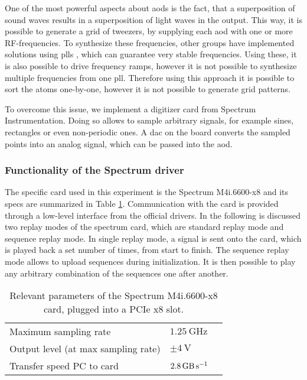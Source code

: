 One of the most powerful aspects about \acp{aod} is the fact, that a superposition of sound waves results in a superposition of light waves in the output. This way, it is possible to generate a grid of tweezers, by supplying each \ac{aod} with one or more RF-frequencies. To synthesize these frequencies, other groups have implemented solutions using \acp{pll} , which can guarantee very stable frequencies. Using these, it is also possible to drive frequency ramps, however it is not possible to synthesize multiple frequencies from one \ac{pll}. Therefore using this approach it is possible to sort the atoms one-by-one, however it is not possible to generate grid patterns.

To overcome this issue, we implement a digitizer card from Spectrum Instrumentation. Doing so allows to sample arbitrary signals, for example sines, rectangles or even non-periodic ones. A \ac{dac} on the board converts the sampled points into an analog signal, which can be passed into the \ac{aod}.

\subsubsection*{Functionality of the Spectrum driver}

The specific card used in this experiment is the Spectrum M4i.6600-x8 and its specs are summarized in Table \ref{tbl:spec_m4i}. Communication with the card is provided through a low-level interface from the official drivers. In the following is discussed two replay modes of the spectrum card, which are standard replay mode and sequence replay mode. In single replay mode, a signal is sent onto the card, which is played back a set number of times, from start to finish. The sequence replay mode allows to upload sequences during initialization. It is then possible to play any arbitrary combination of the sequences one after another.

\begin{table}[bt]
\label{tbl:spec_m4i}
\centering
\begin{tabular}{l|l|l}
	\hline \hline
	Maximum sampling rate & $\SI{1.25}{\giga\hertz}$ \\
	Output level (at max sampling rate) & $\pm \SI{4}{\volt}$ \\
	Transfer speed PC to card & $\SI{2.8}{\giga\byte\per\second}$ \\
	\hline \hline
\end{tabular}
\caption{Relevant parameters of the Spectrum M4i.6600-x8 card, plugged into a PCIe x8 slot.}
\end{table}

